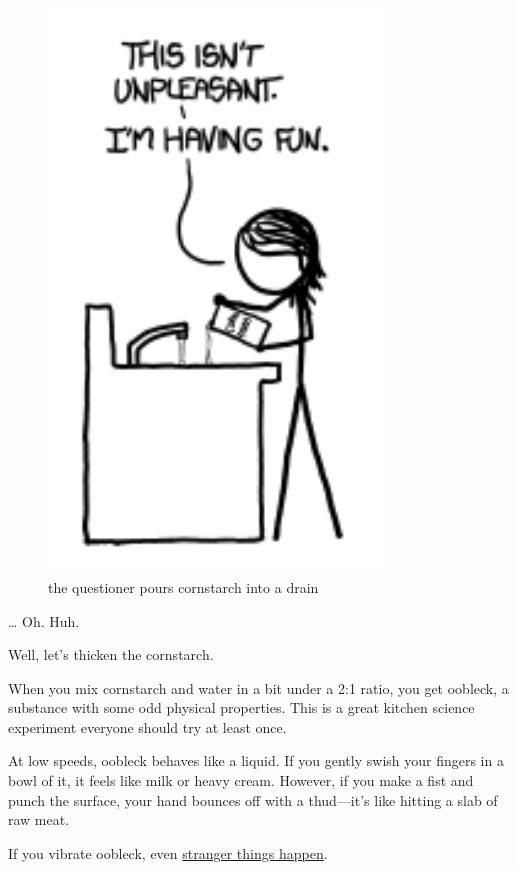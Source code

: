 \begin{figure}[!htbp]
\centering
\includegraphics[scale=0.5, max width=0.8\textwidth]{imgs/a/36/cornstarch_boring.png}
\caption{the questioner pours cornstarch into a drain}
\end{figure}

{… Oh. Huh.}

{Well, let’s thicken the cornstarch.}

{When you mix cornstarch and water in a bit under a 2:1 ratio, you get oobleck, a substance with some odd physical properties. This is a great kitchen science experiment everyone should try at least once.}

{At low speeds, oobleck behaves like a liquid. If you gently swish your fingers in a bowl of it, it feels like milk or heavy cream. However, if you make a fist and punch the surface, your hand bounces off with a thud—it’s like hitting a slab of raw meat.}

{If you vibrate oobleck, even \href{http://www.youtube.com/watch?v=3zoTKXXNQIU}{stranger things happen}.}

